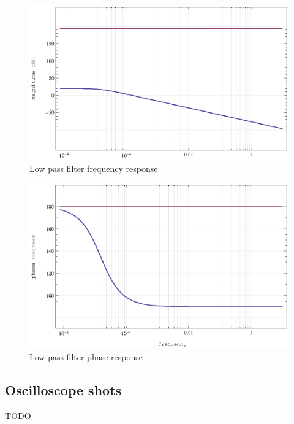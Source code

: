 \documentclass[11pt,a4paper]{article}
\begin{document}
\begin{figure}[htbp]
    \centering
        \includegraphics[]{img/lpf-magnitude.eps}
    \caption{Low pass filter frequency response}
    \label{fig:lpf-magnitude}
\end{figure}

\begin{figure}[htbp]
    \centering
        \includegraphics[]{img/lpf-phase.eps}
    \caption{Low pass filter phase response}
    \label{fig:lpf-phase}
\end{figure}


\subsection{Oscilloscope shots}\label{lpf-oscilloscope-shots}
TODO


\end{document}
